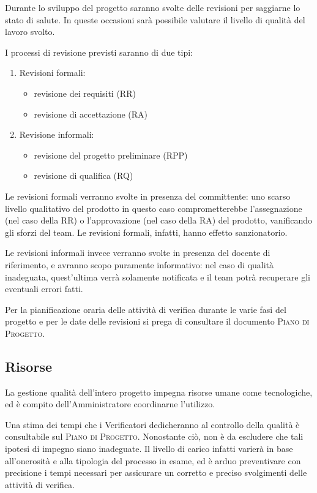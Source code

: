 \documentclass[11pt,a4paper]{article}
\begin{document}
Durante lo sviluppo del progetto saranno svolte delle revisioni per saggiarne lo stato di salute. In queste occasioni sarà possibile valutare il livello di qualità del lavoro svolto.

I processi di revisione previsti saranno di due tipi:
\begin{enumerate}
 	\item Revisioni formali:
	\begin{itemize}
		\item revisione dei requisiti (RR)
		\item revisione di accettazione (RA)
	\end{itemize}
 	\item Revisione informali:
	\begin{itemize}
		\item revisione del progetto preliminare (RPP)
		\item revisione di qualifica (RQ)
	\end{itemize}
\end{enumerate}
Le revisioni formali verranno svolte in presenza del committente: uno scarso livello qualitativo del prodotto in questo caso comprometterebbe l'assegnazione (nel caso della RR) o l'approvazione (nel caso della RA) del prodotto, vanificando gli sforzi del team. Le revisioni formali, infatti, hanno effetto sanzionatorio.

Le revisioni informali invece verranno svolte in presenza del docente di riferimento, e avranno scopo puramente informativo: nel caso di qualità ina\-deguata, quest'ultima verrà solamente notificata e il team potrà recuperare gli eventuali errori fatti.

Per la pianificazione oraria delle attività di verifica durante le varie fasi del progetto e per le date delle revisioni si prega di consultare il documento \textsc{Piano di Progetto}.
\subsection{Risorse}
La gestione qualità dell'intero progetto impegna risorse umane come tecnologiche, ed è compito dell'Amministratore coordinarne l'utilizzo.

Una stima dei tempi che i Verificatori dedicheranno al controllo della qualità è consultabile sul \textsc{Piano di Progetto}. Nonostante ciò, non è da escludere che tali ipotesi di impegno siano inadeguate. Il livello di carico infatti varierà in base all'onerosità e alla tipologia del processo in esame, ed è arduo preventivare con precisione i tempi necessari per assicurare un corretto e preciso svolgimenti delle attività di verifica.
\end{document}
